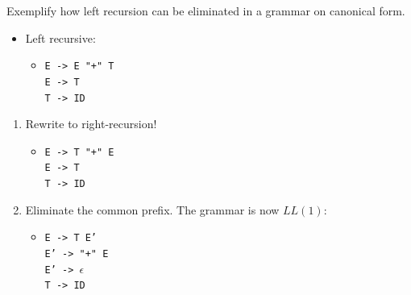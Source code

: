 \documentclass[11pt]{beamer}
\begin{document}
\begin{frame}


\begin{block}{Exemplify how left recursion can be eliminated in a grammar on canonical form.}
\begin{itemize}
\item Left recursive:
\begin{itemize}
\item
\texttt{E -> E "+" T }\\
\texttt{E -> T}\\
\texttt{T -> ID}
\end{itemize}
\end{itemize}
\begin{enumerate}
\item Rewrite to right-recursion!
\begin{itemize}
\item 
\texttt{E -> T "+" E}\\
\texttt{E -> T}\\
\texttt{T -> ID}

\end{itemize}
\item Eliminate the common prefix. The grammar is now $LL(1)$:
\begin{itemize}
\item
\texttt{E -> T E' }\\
\texttt{E' -> "+" E }\\
\texttt{E' -> $\epsilon$}\\
\texttt{T -> ID}
\end{itemize}
\end{enumerate}
\end{block}

\end{frame}
\end{document}
